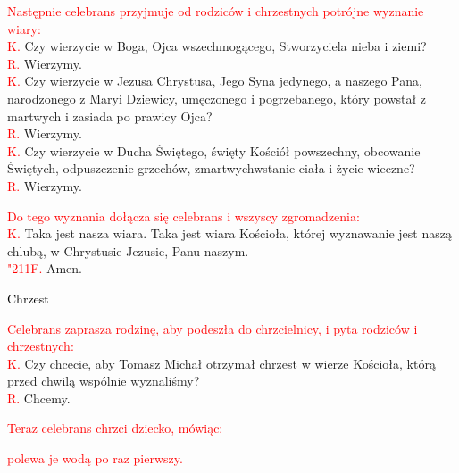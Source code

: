 \documentclass[10pt, a5paper]{extarticle}
\newcommand{\textjuni}[1]{{\fontspec{Junicode}#1}}
\newcommand{\response}{\textcolor{red}{\textjuni{\char"211F. }}}
\begin{document}
\textcolor{red}{Następnie celebrans przyjmuje od rodziców i chrzestnych potrójne wyznanie wiary:} \\
\textcolor{red}{K.} Czy wierzycie w Boga, Ojca wszechmogącego, Stworzyciela nieba i ziemi?  \\
\textcolor{red}{R.} Wierzymy. \\
\textcolor{red}{K.} Czy wierzycie w Jezusa Chrystusa, Jego Syna jedynego, a naszego Pana, narodzonego z Maryi Dziewicy, umęczonego i pogrzebanego, który powstał z martwych i zasiada po prawicy Ojca?  \\
\textcolor{red}{R.} Wierzymy. \\
\textcolor{red}{K.} Czy wierzycie w Ducha Świętego, święty Kościół powszechny, obcowanie Świętych, odpuszczenie grzechów, zmartwychwstanie ciała i życie wieczne?  \\
\textcolor{red}{R.} Wierzymy.

\textcolor{red}{Do tego wyznania dołącza się celebrans i wszyscy zgromadzenia:} \\
\textcolor{red}{K.} Taka jest nasza wiara. Taka jest wiara Kościoła, której wyznawanie jest naszą chlubą, w Chrystusie Jezusie, Panu naszym. \\
\response Amen.

\begin{center}
\Large
\noindent\textcolor{black}{Chrzest}
\end{center}

\textcolor{red}{Celebrans zaprasza rodzinę, aby podeszła do chrzcielnicy, i pyta rodziców i chrzestnych:} \\
\textcolor{red}{K.} Czy chcecie, aby Tomasz Michał otrzymał chrzest w wierze Kościoła, którą przed chwilą wspólnie wyznaliśmy? \\
\textcolor{red}{R.} Chcemy.

\begin{center}
\textcolor{red}{Teraz celebrans chrzci dziecko, mówiąc:}
\end{center}

\begin{Parallel}[v]{0.485\textwidth}{0.485\textwidth}
\end{Parallel}

\begin{center}
\textcolor{red}{polewa je wodą po raz pierwszy.}
\end{center}
\end{document}
